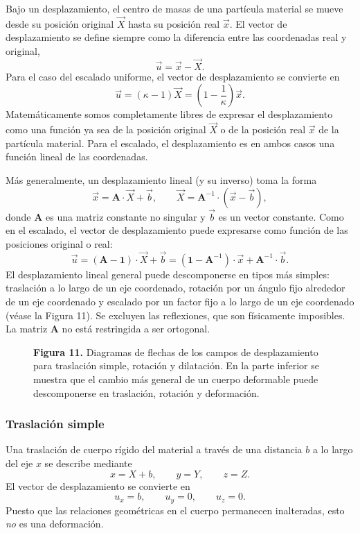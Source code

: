 Bajo un desplazamiento, el centro de masas de una partícula material se mueve desde su posición original $\vec{X}$ hasta su posición real $\vec{x}$. El vector de desplazamiento se define siempre como la diferencia entre las coordenadas real y original,
\[ \vec{u} = \vec{x} - \vec{X}. \tag{68} \]
Para el caso del escalado uniforme, el vector de desplazamiento se convierte en
\[ \vec{u} = (\kappa - 1)\vec{X} = \left(1 - \frac{1}{\kappa}\right)\vec{x}. \tag{69} \]
Matemáticamente somos completamente libres de expresar el desplazamiento como una función ya sea de la posición original $\vec{X}$ o de la posición real $\vec{x}$ de la partícula material. Para el escalado, el desplazamiento es en ambos casos una función lineal de las coordenadas.

Más generalmente, un desplazamiento lineal (y su inverso) toma la forma
\[ \vec{x} = \mathbf{A}\cdot\vec{X} + \vec{b}, \qquad \vec{X} = \mathbf{A}^{-1}\cdot\left(\vec{x} - \vec{b}\right), \tag{70} \]
donde $\mathbf{A}$ es una matriz constante no singular y $\vec{b}$ es un vector constante. Como en el escalado, el vector de desplazamiento puede expresarse como función de las posiciones original o real:
\[ \vec{u} = (\mathbf{A} - \mathbf{1})\cdot\vec{X} + \vec{b} = \left(\mathbf{1} - \mathbf{A}^{-1}\right)\cdot\vec{x} + \mathbf{A}^{-1}\cdot\vec{b}. \tag{71} \]
El desplazamiento lineal general puede descomponerse en tipos más simples: traslación a lo largo de un eje coordenado, rotación por un ángulo fijo alrededor de un eje coordenado y escalado por un factor fijo a lo largo de un eje coordenado (véase la Figura 11). Se excluyen las reflexiones, que son físicamente imposibles. La matriz $\mathbf{A}$ no está restringida a ser ortogonal.

\begin{figure}[H]
\centering

\par\medskip
\textbf{Figura 11.} Diagramas de flechas de los campos de desplazamiento para traslación simple, rotación y dilatación. En la parte inferior se muestra que el cambio más general de un cuerpo deformable puede descomponerse en traslación, rotación y deformación.
\end{figure}

\subsubsection{Traslación simple}

Una traslación de cuerpo rígido del material a través de una distancia $b$ a lo largo del eje $x$ se describe mediante
\[ x = X + b, \qquad y = Y, \qquad z = Z. \tag{72} \]
El vector de desplazamiento se convierte en
\[ u_x = b, \qquad u_y = 0, \qquad u_z = 0. \tag{73} \]
Puesto que las relaciones geométricas en el cuerpo permanecen inalteradas, esto \emph{no} es una deformación.

